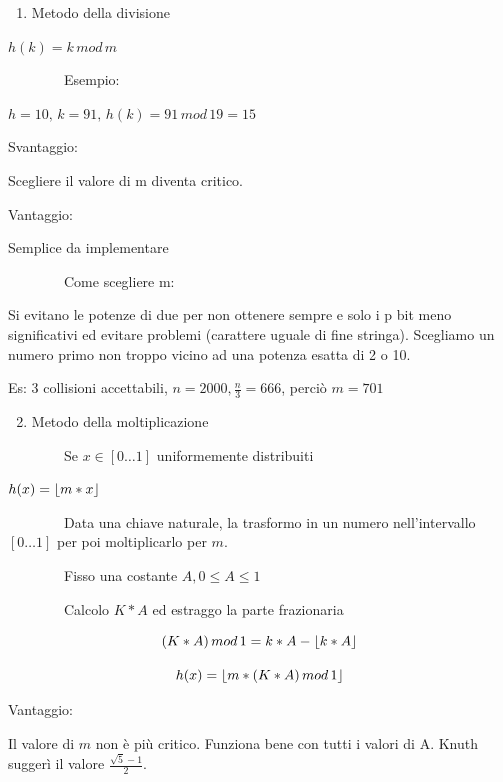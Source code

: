 \documentclass[tikz]{article}
\DeclarePairedDelimiter\floor{\lfloor}{\rfloor}
\providecommand{\tightlist}{%
  \setlength{\itemsep}{0pt}\setlength{\parskip}{0pt}}
\begin{document}
\begin{enumerate}
\tightlist
\item
  {Metodo della divisione}
\end{enumerate}

{}

$h(k) = k\,mod\,m$

{~~~~~~~~Esempio: }

$h=10,\,k=91,\,h(k)=91\,mod\,19=15$

{}

{Svantaggio: }

{Scegliere il valore di m diventa critico. }

{}

{Vantaggio:}

{Semplice da implementare}

{}

{~~~~~~~~Come scegliere m:}

{Si evitano le potenze di due per non ottenere sempre e solo i p bit
meno significativi ed evitare problemi (carattere uguale di fine
stringa). Scegliamo un numero primo non troppo vicino ad una potenza
esatta di 2 o 10.}

{Es: 3 collisioni accettabili, $n=2000,\frac{n}{3}=666$, perciò $m=701$}

\begin{enumerate}
\setcounter{enumi}{1}
\tightlist
\item
  {Metodo della moltiplicazione}
\end{enumerate}

{~~~~~~~~Se $x \in [0\ldots1]$ uniformemente distribuiti}

$h(x) = \floor*{m*x}$

{~~~~~~~~Data una chiave naturale, la trasformo in un numero nell'intervallo $[0\ldots1]$ per poi moltiplicarlo per $m$.}

{~~~~~~~~Fisso una costante $A, 0 \leq A \leq 1$}

{~~~~~~~~Calcolo $K*A$ ed estraggo la parte frazionaria}

\begin{equation}
(K*A)\,mod\,1 = k * A - \floor*{k*A}
\end{equation}

\begin{equation}
h(x) = \floor*{m*(K*A)\,mod\,1}
\end{equation}

{Vantaggio:}

{Il valore di $m$ non è più critico. Funziona bene con tutti i valori di A. Knuth suggerì il valore $\frac{\sqrt{5}-1}{2}$.}
\end{document}
